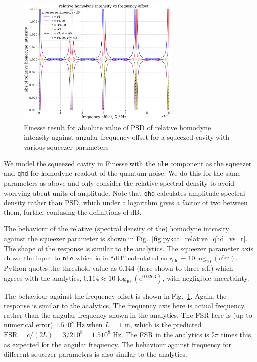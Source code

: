 \documentclass[aps,pra,superscriptaddress,reprint,nofootinbib]{revtex4-1}
\newcommand{\code}[1]{\texttt{#1}}
\begin{document}
\begin{figure}
	\begin{center}
	\includegraphics[width=0.7\textwidth]{figures/pykat_relative_qhd_vs_freq.pdf}
	\end{center}
	\caption{Finesse result for absolute value of PSD of relative homodyne intensity against angular frequency offset for a squeezed cavity with various squeezer parameters}
	\label{fig:pykat_relative_qhd_vs_freq}
\end{figure}

We model the squeezed cavity in Finesse with the \code{nle} component as the squeezer and \code{qhd} for homodyne readout of the quantum noise. We do this for the same parameters as above and only consider the relative spectral density to avoid worrying about units of amplitude. Note that \code{qhd} calculates amplitude spectral density rather than PSD, which under a logarithm gives a factor of two between them, further confusing the definitions of dB.


The behaviour of the relative (spectral density of the) homodyne intensity against the squeezer parameter is shown in Fig.~\ref{fig:pykat_relative_qhd_vs_r}. The shape of the response is similar to the analytics. The squeezer parameter axis shows the input to \code{nle} which is in ``dB'' calculated as $r_{\mathrm{nle}} = 10 \log_{10}(e^{r_\mathrm{sqz}})$. Python quotes the threshold value as $0.144$ (here shown to three s.f.) which agrees with the analytics, $0.114 \approx 10 \log_{10}(e^{0.0263})$, with negligible uncertainty.


The behaviour against the frequency offset is shown in Fig.~\ref{fig:pykat_relative_qhd_vs_freq}. Again, the response is similar to the analytics. The frequency axis here is actual frequency, rather than the angular frequency shown in the analytics. The FSR here is (up to numerical error) $1.5 10^8$ Hz when $L = 1$ m, which is the predicted $\mathrm{FSR} = c/(2 L) = 3/2 10^8 = 1.5 10^8$ Hz. The FSR in the analytics is $2 \pi$ times this, as expected for the angular frequency. The behaviour against frequency for different squeezer parameters is also similar to the analytics.
\end{document}
